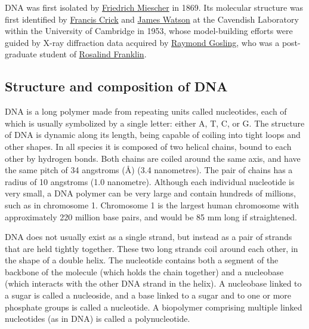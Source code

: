 DNA was first isolated by \href{https://en.wikipedia.org/wiki/Friedrich_Miescher}{Friedrich Miescher} in 1869. Its molecular structure was first identified by \href{https://en.wikipedia.org/wiki/Francis_Crick}{Francis Crick} and \href{https://en.wikipedia.org/wiki/James_Watson}{James Watson} at the Cavendish Laboratory within the University of Cambridge in 1953, whose model-building efforts were guided by X-ray diffraction data acquired by \href{https://en.wikipedia.org/wiki/Raymond_Gosling}{Raymond Gosling}, who was a post-graduate student of \href{https://en.wikipedia.org/wiki/Rosalind_Franklin}{Rosalind Franklin}.

\hypertarget{structure-and-composition-of-dna}{%
\subsection{Structure and composition of DNA}\label{structure-and-composition-of-dna}}

DNA is a long polymer made from repeating units called nucleotides, each of which is usually symbolized by a single letter: either A, T, C, or G. The structure of DNA is dynamic along its length, being capable of coiling into tight loops and other shapes. In all species it is composed of two helical chains, bound to each other by hydrogen bonds. Both chains are coiled around the same axis, and have the same pitch of 34 angstroms (Å) (3.4 nanometres). The pair of chains has a radius of 10 angstroms (1.0 nanometre). Although each individual nucleotide is very small, a DNA polymer can be very large and contain hundreds of millions, such as in chromosome 1. Chromosome 1 is the largest human chromosome with approximately 220 million base pairs, and would be 85 mm long if straightened.

DNA does not usually exist as a single strand, but instead as a pair of strands that are held tightly together. These two long strands coil around each other, in the shape of a double helix. The nucleotide contains both a segment of the backbone of the molecule (which holds the chain together) and a nucleobase (which interacts with the other DNA strand in the helix). A nucleobase linked to a sugar is called a nucleoside, and a base linked to a sugar and to one or more phosphate groups is called a nucleotide. A biopolymer comprising multiple linked nucleotides (as in DNA) is called a polynucleotide.

